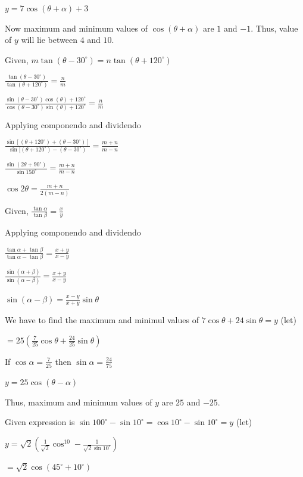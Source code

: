   $y = 7\cos(\theta + \alpha) + 3$

  Now maximum and minimum values of $\cos(\theta + \alpha)$ are $1$ and $-1.$ Thus, value of $y$ will lie
  between $4$ and $10.$

\item Given, $m\tan(\theta - 30^\circ) = n\tan(\theta + 120^\circ)$

  $\frac{\tan(\theta - 30^\circ)}{\tan(\theta + 120^\circ)} = \frac{n}{m}$

  $\frac{\sin(\theta - 30^\circ)\cos(\theta) + 120^\circ}{\cos(\theta - 30^\circ)\sin(\theta) + 120^\circ} = \frac{n}{m}$

  Applying componendo and dividendo

  $\frac{\sin[(\theta + 120^\circ) + (\theta - 30^\circ)]}{\sin[(\theta + 120^\circ) - (\theta - 30^\circ)} = \frac{m +
      n}{m - n}$

  $\frac{\sin(2\theta + 90^\circ)}{\sin150^\circ} = \frac{m + n}{m - n}$

  $\cos2\theta = \frac{m + n}{2(m - n)}$

\item Given, $\frac{\tan\alpha}{\tan\beta} = \frac{x}{y}$

  Applying componendo and dividendo

  $\frac{\tan\alpha + \tan\beta}{\tan\alpha - \tan\beta} = \frac{x + y}{x - y}$

  $\frac{\sin(\alpha + \beta)}{\sin(\alpha - \beta)} = \frac{x + y}{x - y}$

  $\sin(\alpha - \beta) = \frac{x - y}{x + y}\sin\theta$

\item We have to find the maximum and minimul values of $7\cos\theta + 24\sin\theta = y$ (let)

  $= 25\left(\frac{7}{25}\cos\theta + \frac{24}{25}\sin\theta\right)$

  If $\cos\alpha = \frac{7}{25}$ then $\sin\alpha = \frac{24}{75}$

  $y = 25\cos(\theta - \alpha)$

  Thus, maximum and minimum values of $y$ are $25$ and $-25.$

\item Given expression is $\sin100^\circ - \sin10^\circ = \cos10^\circ - \sin10^\circ = y$ (let)

  $y = \sqrt{2}\left(\frac{1}{\sqrt{2}}\cos^10 - \frac{1}{\sqrt{2}\sin10^\circ}\right)$

  $= \sqrt{2}\cos(45^\circ + 10^\circ)$

